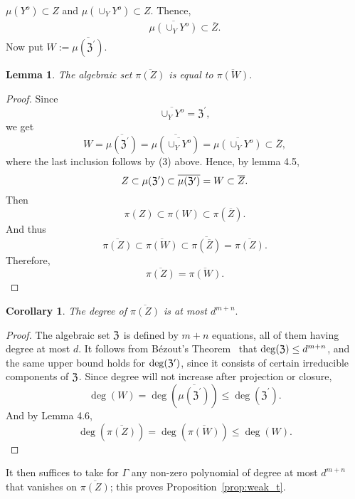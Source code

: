 \documentclass[a4paper]{article}
\def\fZp{{\mathfrak Z^{'}}}
\newtheorem{corollary}[theorem]{Corollary}
\newtheorem{lemma}[theorem]{Lemma}
\begin{document}
    $\mu(Y^o) \subset Z$ and $\mu(\cup_Y Y^o) \subset Z.$ Thence, 
    \begin{align}
    \overline{\mu(\cup_Y Y^o)} \subset \overline{Z}.
    \end{align}
    Now put $W := \overline{\mu(\fZp)}$.
    \begin{lemma}
    The algebraic set $\overline{\pi(Z)}$ is equal to $\overline{\pi(W)}.$
    \end{lemma}
    \begin{proof}
    Since 
    \[
    \overline{\cup_Y Y^o} = \fZp,
    \]
    we get 
    \[
    W = \overline{\mu(\fZp)} = \overline{\mu(\overline{\cup_Y Y^o})}
    = \overline{\mu(\cup_Y Y^o)} \subset \overline{Z},
    \]
    where the last inclusion follows by (3) above.
    Hence, by lemma 4.5,
    \[
    Z\subset\mu(\frak{Z}')\subset \overline{\mu(\frak{Z}')} = W \subset \overline{Z}.
    \]
    Then 
    \[
    \pi(Z) \subset \pi(W) \subset \pi(\overline{Z}).
    \]
    And thus
    \[
    \overline{\pi(Z)} \subset \overline{\pi(W)} \subset \overline{\pi(\overline{Z})} =\overline{\pi(Z)}.
    \]
    Therefore,
    \[
    \overline{\pi(Z)} = \overline{\pi(W)}.
    \]
    \end{proof}
    \begin{corollary} 
      The degree of $\overline{\pi(Z)}$ is at most $d^{m+n}.$
    \end{corollary}
    \begin{proof}
      The algebraic set $\frak Z$ is defined by $m+n$ equations, all of
      them having degree at most $d$. It follows from B\'ezout's
      Theorem~\cite{H} that $\deg(\frak{Z}) \leq d^{m+n}$, and the same
      upper bound holds for $\deg(\frak{Z}')$, since it consists of
      certain irreducible components of $\frak Z$. Since degree will not increase after projection or closure, 
      \[
      \deg (W) = \deg( \overline{\mu(\fZp)}) \leq \deg(\fZp).
      \]
      And by Lemma 4.6,
      \[
      \deg(\overline{\pi(Z)})
      =
      \deg(\overline{\pi(W)})
      \leq
      \deg(W).
      \]
    \end{proof}
    \noindent
    It then suffices to take for $\Gamma$ any
    non-zero polynomial of degree at most $d^{m+n}$ that vanishes on
    $\overline{\pi(Z)}$; this proves Proposition~\ref{prop:weak_t}.


\end{document}
